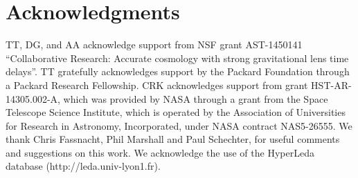 \section*{Acknowledgments}

TT, DG, and AA acknowledge support from NSF grant AST-1450141
``Collaborative Research: Accurate cosmology with strong gravitational
lens time delays''. TT gratefully acknowledges support by the Packard
Foundation through a Packard Research Fellowship. CRK acknowledges support from grant HST-AR-14305.002-A, which was provided by NASA through a grant from the Space Telescope Science Institute, which is operated by the Association of Universities for Research in Astronomy, Incorporated, under NASA contract NAS5-26555. We thank Chris
Fassnacht, Phil Marshall and Paul Schechter, for useful comments and
suggestions on this work. We acknowledge the use of the  HyperLeda database (http://leda.univ-lyon1.fr).


